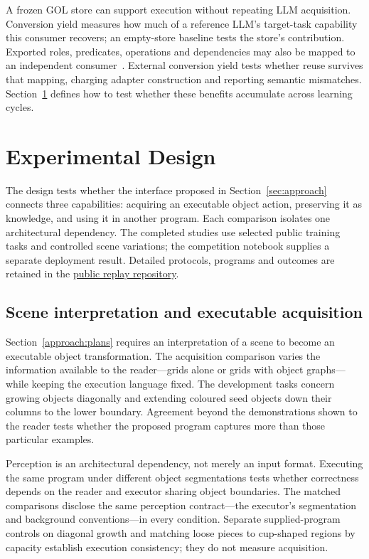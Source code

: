 \documentclass[11pt]{article}
\begin{document}
A frozen GOL store can support execution without repeating LLM acquisition. Conversion yield measures how much of a reference LLM's target-task capability this consumer recovers; an empty-store baseline tests the store's contribution. Exported roles, predicates, operations and dependencies may also be mapped to an independent consumer~\cite{mapping}. External conversion yield tests whether reuse survives that mapping, charging adapter construction and reporting semantic mismatches. Section~\ref{sec:experimental-design} defines how to test whether these benefits accumulate across learning cycles.

\section{Experimental Design}\label{sec:experimental-design}\label{design:evaluation-scope}
The design tests whether the interface proposed in Section~\ref{sec:approach} connects three capabilities: acquiring an executable object action, preserving it as knowledge, and using it in another program. Each comparison isolates one architectural dependency. The completed studies use selected public training tasks and controlled scene variations; the competition notebook supplies a separate deployment result. Detailed protocols, programs and outcomes are retained in the \href{https://github.com/lenyabloko/arc-gol-paper-replay}{public replay repository}.

\subsection{Scene interpretation and executable acquisition}\label{design:construction}\label{design:perception}\label{design:perception-diagnostic}\label{design:execution}
Section~\ref{approach:plans} requires an interpretation of a scene to become an executable object transformation. The acquisition comparison varies the information available to the reader---grids alone or grids with object graphs---while keeping the execution language fixed. The development tasks concern growing objects diagonally and extending coloured seed objects down their columns to the lower boundary. Agreement beyond the demonstrations shown to the reader tests whether the proposed program captures more than those particular examples.

Perception is an architectural dependency, not merely an input format. Executing the same program under different object segmentations tests whether correctness depends on the reader and executor sharing object boundaries. The matched comparisons disclose the same perception contract---the executor's segmentation and background conventions---in every condition. Separate supplied-program controls on diagonal growth and matching loose pieces to cup-shaped regions by capacity establish execution consistency; they do not measure acquisition.
\end{document}
